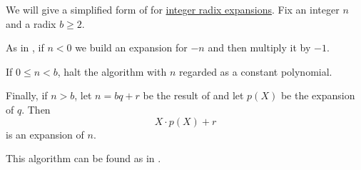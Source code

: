 \begin{algorithm}\label{alg:integer_radix_expansion}
  We will give a simplified form of  for \hyperref[def:integer_radix_expansion]{integer radix expansions}. Fix an integer \( n \) and a radix \( b \geq 2 \).

  \begin{thmenum}
     As in , if \( n < 0 \) we build an expansion for \( -n \) and then multiply it by \( -1 \).

     If \( 0 \leq n < b \), halt the algorithm with \( n \) regarded as a constant polynomial.

     Finally, if \( n > b \), let \( n = bq + r \) be the result of  and let \( p(X) \) be the expansion of \( q \). Then
    \begin{equation*}
      X \cdot p(X) + r
    \end{equation*}
    is an expansion of \( n \).
  \end{thmenum}
\end{algorithm}
\begin{comments}
  \item This algorithm can be found as  in \cite{notebook:code}.
\end{comments}
